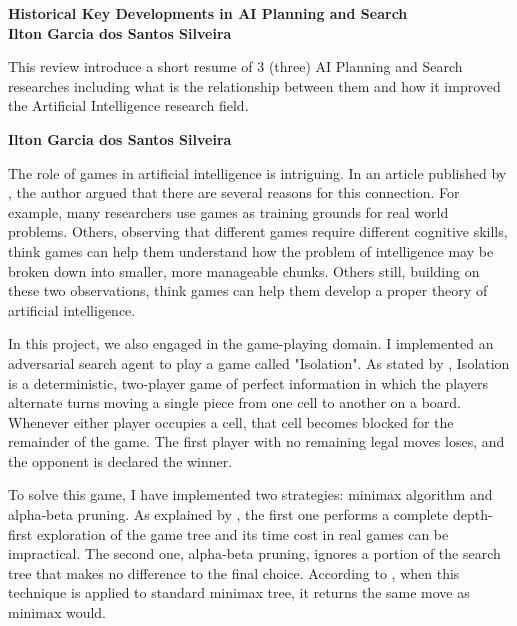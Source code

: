\documentclass[a4paper]{article}
\begin{document}

\begin{center}

{\bf \large Historical Key Developments in AI Planning and Search \\ \small Ilton Garcia dos Santos Silveira}
\end{center}



This review introduce a short resume of 3 (three) AI Planning and Search researches including what is the relationship
between them and how it improved the Artificial Intelligence research field.


{\bigskip}
{\bf \small Ilton Garcia dos Santos Silveira}

The role of games in artificial intelligence is intriguing. In an article published by \cite{Economist2017}, the author argued that there are several reasons for this connection. For example, many researchers use games as training grounds for real world problems. Others, observing that different games require different cognitive skills, think games can help them understand how the problem of intelligence may be broken down into smaller, more manageable chunks. Others still, building on these two observations, think games can help them develop a proper theory of artificial intelligence.

In this project, we also engaged in the game-playing domain. I implemented an adversarial search agent to play a game called "Isolation". As stated by \cite{Udacity2017}, Isolation is a deterministic, two-player game of perfect information in which the players alternate turns moving a single piece from one cell to another on a board. Whenever either player occupies a cell, that cell becomes blocked for the remainder of the game. The first player with no remaining legal moves loses, and the opponent is declared the winner.

To solve this game, I have implemented two strategies: minimax algorithm and alpha-beta pruning. As explained by \cite{russelartificial}, the first one performs a complete depth-first exploration of the game tree and its time cost in real games can be impractical. The second one, alpha-beta pruning, ignores a portion of the search tree that makes no difference to the final choice. According to \cite{russelartificial}, when this technique is applied to standard minimax tree, it returns the same move as minimax would.
\end{document}
